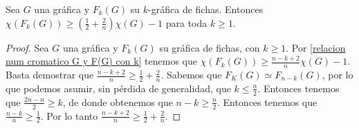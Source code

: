     
        
    
    \begin{teorema}
    \label{relacion num cromatico indep k}
        Sea $G$ una gr\'afica y $F_k(G)$ su $k$-gr\'afica de fichas. Entonces $\chi
        (F_k(G)) \geq (\frac{1}{2}+ \frac{2}{n})\chi(G) -1 $ para toda $k \geq 1$.
    \end{teorema}
    
    \begin{proof}
        Sea $G$ una gr\'afica y $F_k(G)$ su gr\'afica de fichas, con $k \geq 1$. Por
        \cref{relacion num cromatico G y F(G) con k} tenemos que $\chi(F_k(G)) \geq
        \frac{n-k+2}{n} \chi(G) -1$. Basta demostrar que $\frac{n-k+2}{n} \geq
        \frac{1}{2}+\frac{2}{n}$. Sabemos que $F_K(G) \simeq F_{n-k}(G)$, por lo que
        podemos asumir, sin p\'erdida de generalidad, que $k\leq \frac{n}{2}$.
        Entonces tenemos que $\frac{2n-n}{2}\geq k$, de donde obtenemos que $n-k
        \geq \frac{n}{2}$. Entonces tenemos que $\frac{n-k}{n}\geq \frac{1}{2}$. Por
        lo tanto $\frac{n-k+2}{n} \geq \frac{1}{2}+\frac{2}{n}$.
    \end{proof}